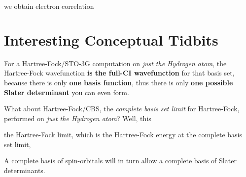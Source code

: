 \documentclass{article}
\begin{document}
  we obtain electron correlation 


\section{Interesting Conceptual Tidbits}
For a Hartree-Fock/STO-3G computation on \textit{just the Hydrogen atom}, the Hartree-Fock wavefunction \textbf{is the full-CI wavefunction} for that basis set, 
    because there is only \textbf{one basis function}, thus there is only \textbf{one possible Slater determinant} you can even form.

What about Hartree-Fock/CBS, the \textit{complete basis set limit} for Hartree-Fock, performed on \textit{just the Hydrogen atom}?
Well, this


the Hartree-Fock limit, which is the Hartree-Fock energy at the complete basis set limit, 

A complete basis of spin-orbitals will in turn allow a complete basis of Slater determinants.

\end{document}

